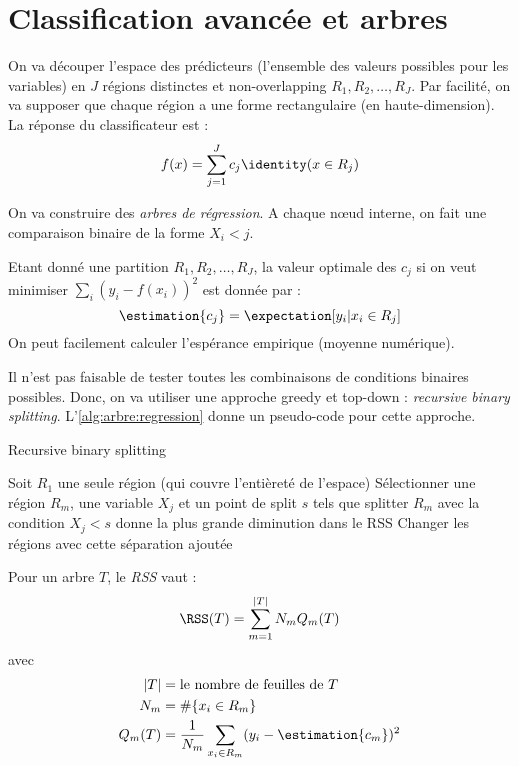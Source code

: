 \section{Classification avancée et arbres}
    On va découper l'espace des prédicteurs (l'ensemble des valeurs possibles pour les variables) en \(J\) régions distinctes et non-overlapping \(R_1, R_2, \dots, R_J\). Par facilité, on va supposer que chaque région a une forme rectangulaire (en haute-dimension). La réponse du classificateur est :
    \[
        f(x) = \sum_{j=1}^J c_j \identity(x \in R_j)
    \]

    \begin{definition}
        On va construire des \textit{arbres de régression}. A chaque nœud interne, on fait une comparaison binaire de la forme \(X_i < j\).

        Etant donné une partition \(R_1, R_2, \dots, R_J\), la valeur optimale des \(c_j\) si on veut minimiser \(\sum_i (y_i - f(x_i))^2\) est donnée par :
        \[
            \estimation{c_j} = \expectation[y_i | x_i \in R_j]
        \]
        On peut facilement calculer l'espérance empirique (moyenne numérique).
    \end{definition}

    Il n'est pas faisable de tester toutes les combinaisons de conditions binaires possibles. Donc, on va utiliser une approche greedy et top-down : \textit{recursive binary splitting}. L'\cref{alg:arbre:regression} donne un pseudo-code pour cette approche.

    \begin{algorithm}
        \caption{Recursive binary splitting}
        \label{alg:arbre:regression}
        \begin{algorithmic}[1]
            \State Soit \(R_1\) une seule région (qui couvre l'entièreté de l'espace)
            \DoUntil
                \State Sélectionner une région \(R_m\), une variable \(X_j\) et un point de split \(s\) tels que splitter \(R_m\) avec la condition \(X_j < s\) donne la plus grande diminution dans le RSS
                \State Changer les régions avec cette séparation ajoutée
        \end{algorithmic}
    \end{algorithm}

    \begin{definition}
        Pour un arbre \(T\), le \textit{RSS} vaut :
        \[
            \RSS(T) = \sum_{m = 1}^{|T|} N_m Q_m(T)
        \]
        avec
        \begin{align*}
            |T| &= \text{le nombre de feuilles de } T\\
            N_m &= \#\{x_i \in R_m\}\\
            Q_m(T) &= \frac{1}{N_m} \sum_{x_i \in R_m} (y_i - \estimation{c_m})^2
        \end{align*}
    \end{definition}

